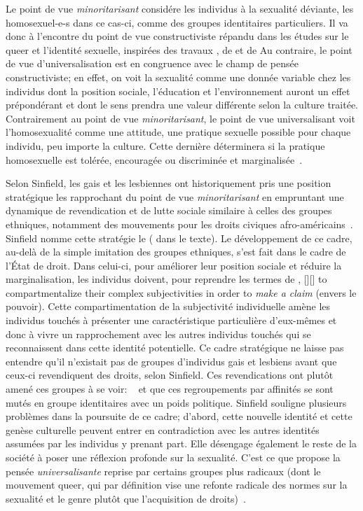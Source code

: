 Le point de vue \emph{minoritarisant} considére les individus à la sexualité déviante, les homosexuel-e-s dans ce cas-ci, comme des groupes identitaires particuliers. 
Il va donc à l'encontre du point de vue constructiviste répandu dans les études sur le queer et l'identité sexuelle, inspirées des travaux \citet{Foucault2011}, de \citet{Rubin2010} et de \citet{Butler2007} 
Au contraire, le point de vue d'universalisation est en congruence avec le champ de pensée constructiviste; en effet, on voit la sexualité comme une donnée variable chez les individus dont la position sociale, l'éducation et l'environnement auront un effet prépondérant et dont le sens prendra une valeur différente selon la culture traitée. 
Contrairement au point de vue \emph{minoritarisant}, le point de vue universalisant voit l'homosexualité comme une attitude, une pratique sexuelle possible pour chaque individu, peu importe la culture. 
Cette dernière déterminera si la pratique homosexuelle est tolérée, encouragée ou discriminée et marginalisée~\citep[271]{Sinfield1996}.

Selon Sinfield, les gais et les lesbiennes ont historiquement pris une position stratégique les rapprochant du point de vue \emph{minoritarisant} en empruntant une dynamique de revendication et de lutte sociale similaire à celles des groupes ethniques, notamment des mouvements pour les droits civiques afro-américains~\citep[271]{Sinfield1996}. 
Sinfield nomme cette stratégie le  ( dans le texte). 
Le développement de ce cadre, au-delà de la simple imitation des groupes ethniques, s'est fait dans le cadre de l'État de droit. 
Dans celui-ci, pour améliorer leur position sociale et réduire la marginalisation, les individus doivent, pour reprendre les termes de \citet{Sinfield1996}, [{\citeyear[272]{Sinfield1996}}][]{\textelp{} to   compartmentalize their complex subjectivities in order to \emph{make a claim} (envers le pouvoir)}.
Cette compartimentation de la subjectivité individuelle amène les individus touchés à présenter une caractéristique particulière d'eux-mêmes et donc à vivre un rapprochement avec les autres individus touchés qui se reconnaissent dans cette identité potentielle. 
Ce cadre stratégique ne laisse pas entendre qu'il n'existait pas de groupes d'individus gais et lesbiens avant que ceux-ci revendiquent des droits, selon Sinfield. 
Ces revendications ont plutôt amené ces groupes à se voir:  ~\citep[272]{Sinfield1996} et que ces regroupements par affinités se sont mutés en groupe identitaires avec un poids politique. 
Sinfield souligne plusieurs problèmes dans la poursuite de ce cadre; d'abord, cette nouvelle identité et cette genèse culturelle peuvent entrer en contradiction avec les autres identités assumées par les individus y prenant part. 
Elle désengage également le reste de la société à poser une réflexion profonde sur la sexualité. 
C'est ce que propose la pensée \emph{universalisante} reprise par certains groupes plus radicaux (dont le mouvement queer, qui par définition vise une refonte radicale des normes sur la sexualité et le genre plutôt que l'acquisition de droits)~\citep[273]{Sinfield1996}.

